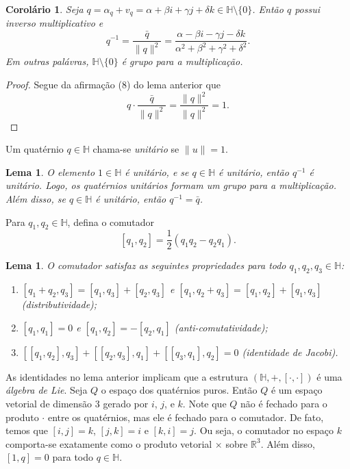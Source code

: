 \documentclass[12pt]{amsart}
\newcommand{\Ha}{\mathbb H}
\newcommand{\R}{\mathbb R}
\newtheorem{corollary}[theorem]{Corolário}
\newtheorem{lemma}[theorem]{Lema}
\theoremstyle{definition}
\begin{document}
\begin{corollary}
    Seja $q=\alpha_q+v_q=\alpha+\beta i+\gamma j+\delta k\in\Ha\setminus\{0\}$. Então $q$ possui inverso multiplicativo 
    e 
    \[
        q^{-1}=\frac{\bar q}{\|q\|^2}=\frac{\alpha-\beta i-\gamma j-\delta k}{\alpha^2+\beta^2+\gamma^2+\delta^2}.
    \]
    Em outras palávras, $\Ha\setminus\{0\}$ é grupo para a multiplicação.
\end{corollary}
\begin{proof}
    Segue da afirmação (8) do lema anterior que 
    \[
        q\cdot \frac{\bar q}{\|q\|^2}=\frac{\|q\|^2}{\|q\|^2}=1.
    \]
\end{proof}

Um quatérnio $q\in\Ha$ chama-se \emph{unitário} se $\|u\|=1$.

\begin{lemma}
    O elemento $1\in\Ha$ é unitário, e se $q\in\Ha$ é unitário, então $q^{-1}$ é unitário. Logo, os quatérnios unitários formam um grupo para a multiplicação. Além disso, se $q\in\Ha$ é unitário, então $q^{-1}=\bar q$.   
\end{lemma}

Para $q_1,q_2\in\Ha$, defina o comutador 
\[
    [q_1,q_2]=\frac 12(q_1q_2-q_2q_1).
\]

\begin{lemma}
    O comutador satisfaz as seguintes propriedades para todo $q_1,q_2,q_3\in\Ha$:
    \begin{enumerate}
        \item $[q_1+q_2,q_3]=[q_1,q_3]+[q_2,q_3]$ e $[q_1,q_2+q_3]=[q_1,q_2]+[q_1,q_3]$ (distributividade);
        \item $[q_1,q_1]=0$ e $[q_1,q_2]=-[q_2,q_1]$ (anti-comutatividade);
        \item $[[q_1,q_2],q_3]+[[q_2,q_3],q_1]+[[q_3,q_1],q_2]=0$ (identidade de Jacobi).
    \end{enumerate}
\end{lemma}


As identidades no lema anterior implicam que a estrutura $(\Ha,+,[\cdot,\cdot])$ é uma \emph{álgebra de Lie}. 
Seja $Q$ o espaço dos quatérnios puros. Então $Q$ é um espaço vetorial de dimensão 3 gerado por $i$, $j$, e $k$. Note que $Q$ não é fechado para o produto $\cdot$ entre os quatérnios, mas ele é fechado para o comutador. 
De fato, temos que $[i,j]=k$, $[j,k]=i$ e $[k,i]=j$. Ou seja, o comutador no espaço $k$ comporta-se 
exatamente como o produto vetorial $\times$ sobre $\R^3$. Além disso, $[1,q]=0$ para todo $q\in\Ha$.  
\end{document}

